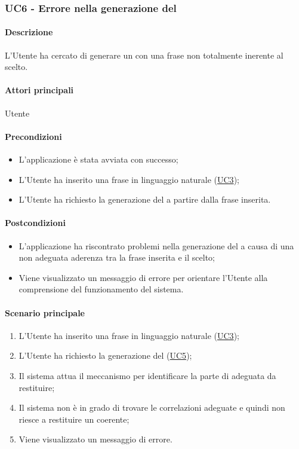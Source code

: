\subsubsection{UC6 - Errore nella generazione del }\label{UC6}
\paragraph*{Descrizione}
L’Utente ha cercato di generare un  con una frase non totalmente inerente al  scelto.

\paragraph*{Attori principali}
Utente

\paragraph*{Precondizioni}
\begin{itemize}
  \item L'applicazione è stata avviata con successo;
  \item L’Utente ha inserito una frase in linguaggio naturale (\hyperref[UC3]{UC3});
  \item L’Utente ha richiesto la generazione del  a partire dalla frase inserita.  
\end{itemize}

\paragraph*{Postcondizioni}
\begin{itemize}
  \item L’applicazione ha riscontrato problemi nella generazione del  a causa di una non adeguata aderenza tra la frase inserita e il  scelto;
  \item Viene visualizzato un messaggio di errore per orientare l’Utente alla comprensione del funzionamento del sistema.
\end{itemize}

\paragraph*{Scenario principale}
\begin{enumerate}
  \item L’Utente ha inserito una frase in linguaggio naturale (\hyperref[UC3]{UC3});
  \item L'Utente ha richiesto la generazione del  (\hyperref[UC5]{UC5});
  \item Il sistema attua il meccanismo per identificare la parte di  adeguata da restituire;
  \item Il sistema non è in grado di trovare le correlazioni adeguate e quindi non riesce a restituire un  coerente;
  \item Viene visualizzato un messaggio di errore.
\end{enumerate}

